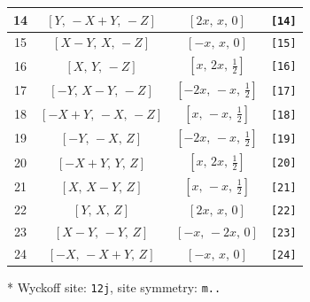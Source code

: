 \documentclass[fleqn,8pt]{jsarticle}
\begin{document}
\begin{longtable}{cccc}
14 & $\left[ Y,\, - X + Y,\, - Z \right]$ & $\left[ 2 x,\, x,\, 0 \right]$ & {\tt [14]} \\ \hline
15 & $\left[ X - Y,\, X,\, - Z \right]$ & $\left[ - x,\, x,\, 0 \right]$ & {\tt [15]} \\ \hline
16 & $\left[ X,\, Y,\, - Z \right]$ & $\left[ x,\, 2 x,\, \frac{1}{2} \right]$ & {\tt [16]} \\ \hline
17 & $\left[ - Y,\, X - Y,\, - Z \right]$ & $\left[ - 2 x,\, - x,\, \frac{1}{2} \right]$ & {\tt [17]} \\ \hline
18 & $\left[ - X + Y,\, - X,\, - Z \right]$ & $\left[ x,\, - x,\, \frac{1}{2} \right]$ & {\tt [18]} \\ \hline
19 & $\left[ - Y,\, - X,\, Z \right]$ & $\left[ - 2 x,\, - x,\, \frac{1}{2} \right]$ & {\tt [19]} \\ \hline
20 & $\left[ - X + Y,\, Y,\, Z \right]$ & $\left[ x,\, 2 x,\, \frac{1}{2} \right]$ & {\tt [20]} \\ \hline
21 & $\left[ X,\, X - Y,\, Z \right]$ & $\left[ x,\, - x,\, \frac{1}{2} \right]$ & {\tt [21]} \\ \hline
22 & $\left[ Y,\, X,\, Z \right]$ & $\left[ 2 x,\, x,\, 0 \right]$ & {\tt [22]} \\ \hline
23 & $\left[ X - Y,\, - Y,\, Z \right]$ & $\left[ - x,\, - 2 x,\, 0 \right]$ & {\tt [23]} \\ \hline
24 & $\left[ - X,\, - X + Y,\, Z \right]$ & $\left[ - x,\, x,\, 0 \right]$ & {\tt [24]} \\
\end{longtable}
* Wyckoff site: {\tt 12j}, site symmetry: {\tt m..}
\renewcommand{\arraystretch}{1.2}
\end{document}
